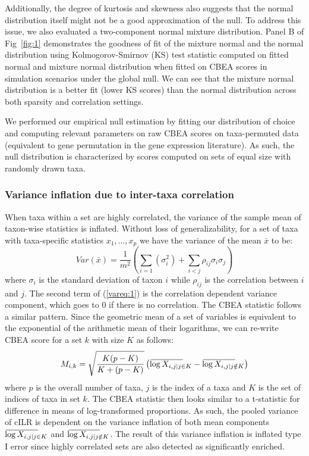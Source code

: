 \documentclass[10pt,letterpaper]{article}
\newcommand{\overbar}[1]{\mkern 2mu\overline{\mkern-2mu#1\mkern-20mu}\mkern 20mu}
\begin{document}
Additionally, the degree of kurtosis and skewness also suggests that the normal distribution itself might not be a good approximation of the null. To address this issue, we also evaluated a two-component normal mixture distribution. Panel B of Fig~\ref{fig:1} demonstrates the goodness of fit of the mixture normal and the normal distribution using Kolmogorov-Smirnov (KS) test statistic computed on fitted normal and mixture normal distribution when fitted on CBEA scores in simulation scenarios under the global null. We can see that the mixture normal distribution is a better fit (lower KS scores) than the normal distribution across both sparsity and correlation settings. 

We performed our empirical null estimation by fitting our distribution of choice and computing relevant parameters on raw CBEA scores on taxa-permuted data (equivalent to gene permutation in the gene expression literature). As such, the null distribution is characterized by scores computed on sets of equal size with randomly drawn taxa. 

\subsubsection*{Variance inflation due to inter-taxa correlation}  
When taxa within a set are highly correlated, the variance of the sample mean of taxon-wise statistics is inflated. Without loss of generalizability, for a set of taxa with taxa-specific statistics $x_1, ..., x_p$ we have the variance of the mean $\bar{x}$ to be:  
\begin{equation} \label{vareq:1}
    Var(\bar{x}) = \frac{1}{m^2}\left(\sum_{i = 1}(\sigma_i^2) + \sum_{i < j}\rho_{ij}\sigma_i\sigma_j\right)
\end{equation}
where $\sigma_i$ is the standard deviation of taxon $i$ while $\rho_{ij}$ is the correlation between $i$ and $j$. The second term of (\ref{vareq:1}) is the correlation dependent variance component, which goes to 0 if there is no correlation. The CBEA statistic follows a similar pattern. Since the geometric mean of a set of variables is equivalent to the exponential of the arithmetic mean of their logarithms, we can re-write CBEA score for a set $k$ with size $K$ as follows:  
\begin{equation}\label{vareq:2}
    M_{i,k} = \sqrt{\frac{K(p - K)}{K + (p - K)}} \left( \overbar{\log{X_{i,j|j \in K}}} - \overbar{\log{X_{i,j|j \notin K}}} \right)   
\end{equation}
where $p$ is the overall number of taxa, $j$ is the index of a taxa and $K$ is the set of indices of taxa in set $k$. The CBEA statistic then looks similar to a t-statistic for difference in means of log-transformed proportions. As such, the pooled variance of cILR is dependent on the variance inflation of both mean components $\overbar{\log{X_{i,j|j \in K}}}$ and $\overbar{\log{X_{i,j|j \notin K}}}$. The result of this variance inflation is inflated type I error since highly correlated sets are also detected as significantly enriched. 
\end{document}
